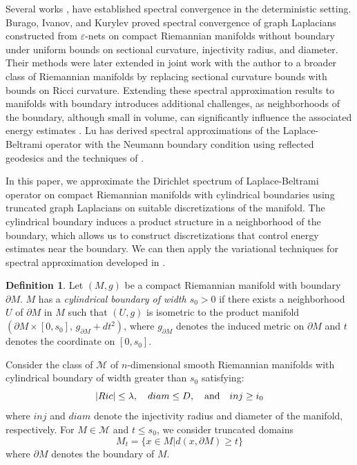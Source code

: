 \documentclass[10 pt, reqno]{amsart}
\newcommand{\M}{\mathcal{M}}
\theoremstyle{definition}
\newtheorem{definition}{Definition}
\numberwithin{equation}{section}
\begin{document}
\par Several works \cite{aubry2013approximation, fujiwara, tatiana},  have established spectral convergence in the deterministic setting. Burago, Ivanov, and Kurylev  \cite{burago} proved spectral convergence of graph Laplacians constructed from $\varepsilon$-nets on compact Riemannian manifolds without boundary under uniform bounds on sectional curvature, injectivity radius, and diameter. Their methods were later extended in joint work with the author \cite{MaityBhattacharya2026} to a broader class of Riemannian manifolds by replacing sectional curvature bounds with bounds on Ricci curvature. Extending these spectral approximation results to manifolds with boundary introduces additional challenges, as neighborhoods of the boundary, although small in volume, can significantly influence the associated energy estimates \cite{pmlr-v23-belkin12}. Lu \cite{lu} has derived spectral approximations of the Laplace-Beltrami operator with the Neumann boundary condition using reflected geodesics and the techniques of  \cite{burago}.

\par In this paper, we approximate the Dirichlet spectrum of Laplace-Beltrami operator on compact Riemannian manifolds with cylindrical boundaries using truncated graph Laplacians on suitable discretizations of the manifold. The cylindrical boundary induces a product structure in a neighborhood of the boundary, which allows us to construct  discretizations that  control  energy estimates near the boundary. We can then apply the variational techniques for spectral approximation developed in \cite{burago}. 

\begin{definition}
Let $(M,g)$ be a compact Riemannian manifold with boundary $\partial M$.  $M$ has a \emph{cylindrical boundary of width $s_0>0$} if there exists a neighborhood $U$ of $\partial M$ in $M$ such that $(U,g)$ is isometric to the product manifold $(\partial M \times [0,s_0],\, g_{\partial M} + dt^2)$, where $g_{\partial M}$ denotes the induced metric on $\partial M$ and $t$ denotes the coordinate on $[0,s_0]$.
\end{definition}

Consider the class of $\M$ of  $ n$-dimensional smooth Riemannian manifolds  with cylindrical boundary of width greater than $s_0$ satisfying:
 $$|Ric|\leq \lambda, \quad diam \leq D, \quad {\rm and} \quad inj\geq i_0$$
 where $inj$ and $diam$ denote the injectivity radius and diameter of the manifold, respectively. For $M\in \M$ and $t\le s_0$, we consider truncated domains 
\[M_t=\{x\in M| d(x,\partial M)\ge t\}\]
where $\partial M$ denotes the boundary of $M$.\\
 
\end{document}
